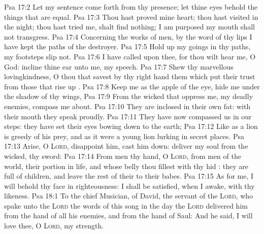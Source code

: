 \vs Psa 17:2 Let my sentence come forth from thy presence; let thine eyes behold the things that are equal.
\vs Psa 17:3 Thou hast proved mine heart; thou hast visited  in the night; thou hast tried me,  shalt find nothing; I am purposed  my mouth shall not transgress.
\vs Psa 17:4 Concerning the works of men, by the word of thy lips I have kept  the paths of the destroyer.
\vs Psa 17:5 Hold up my goings in thy paths,  my footsteps slip not.
\vs Psa 17:6 I have called upon thee, for thou wilt hear me, O God: incline thine ear unto me,  my speech.
\vs Psa 17:7 Shew thy marvellous lovingkindness, O thou that savest by thy right hand them which put their trust  from those that rise up .
\vs Psa 17:8 Keep me as the apple of the eye, hide me under the shadow of thy wings,
\vs Psa 17:9 From the wicked that oppress me,  my deadly enemies,  compass me about.
\vs Psa 17:10 They are inclosed in their own fat: with their mouth they speak proudly.
\vs Psa 17:11 They have now compassed us in our steps: they have set their eyes bowing down to the earth;
\vs Psa 17:12 Like as a lion  is greedy of his prey, and as it were a young lion lurking in secret places.
\vs Psa 17:13 Arise, O \textsc{Lord}, disappoint him, cast him down: deliver my soul from the wicked,  thy sword:
\vs Psa 17:14 From men  thy hand, O \textsc{Lord}, from men of the world,  their portion in  life, and whose belly thou fillest with thy hid : they are full of children, and leave the rest of their  to their babes.
\vs Psa 17:15 As for me, I will behold thy face in righteousness: I shall be satisfied, when I awake, with thy likeness.
\vs Psa 18:1 To the chief Musician,  of David, the servant of the \textsc{Lord}, who spake unto the \textsc{Lord} the words of this song in the day  the \textsc{Lord} delivered him from the hand of all his enemies, and from the hand of Saul: And he said, I will love thee, O \textsc{Lord}, my strength.
